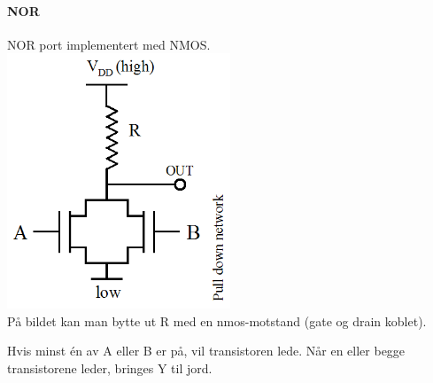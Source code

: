 \paragraph{NOR} \mbox \\
NOR port implementert med NMOS.
\\
\includegraphics[width=0.5\textwidth]{./img/nmos-nor}
\\
På bildet kan man bytte ut R med en nmos-motstand (gate og drain koblet).

Hvis minst én av A eller B er på, vil transistoren lede.
Når en eller begge transistorene leder, bringes Y til jord.
